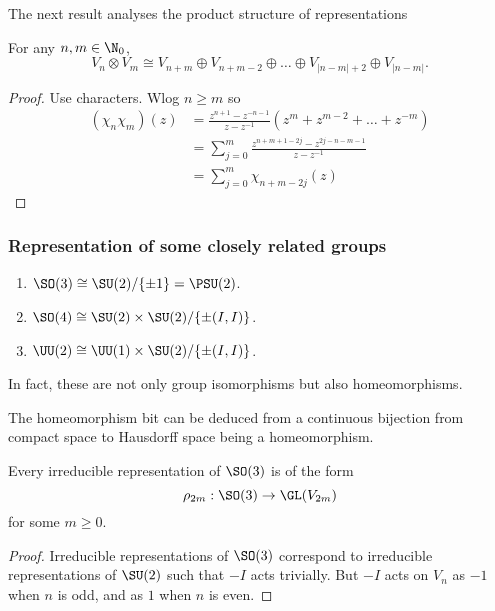\documentclass[a4paper]{article}
\theoremstyle{definition}
\begin{document}
The next result analyses the product structure of representations
\begin{theorem}
  For any \(n, m \in \N_0\),
  \[
    V_n \otimes V_m \cong V_{n + m} \oplus V_{n + m - 2} \oplus \dots \oplus V_{|n - m| + 2} \oplus V_{|n - m|}.
  \]
\end{theorem}

\begin{proof}
  Use characters. Wlog \(n \geq m\) so
  \begin{align*}
    (\chi_n \chi_m) (z)
    &= \frac{z^{n + 1} - z^{-n - 1}}{z - z^{-1}} (z^m + z^{m - 2} + \dots + z^{-m}) \\
    &= \sum_{j = 0}^m \frac{z^{n + m + 1 - 2j} - z^{2j - n - m - 1}}{z - z^{-1}} \\
    &= \sum_{j = 0}^m \chi_{n + m - 2j}(z)
  \end{align*}
\end{proof}

\subsubsection{Representation of some closely related groups}

\begin{proposition}\leavevmode
  \label{prop:isomorphisms of Lie groups}
  \begin{enumerate}
  \item \(\SO(3) \cong \SU(2) /\{\pm 1\} = \PSU(2)\).
  \item \(\SO(4) \cong \SU(2) \times \SU(2)/\{\pm (I, I)\}\).
  \item \(\UU(2) \cong \UU(1) \times \SU(2)/\{\pm (I, I)\}\).
  \end{enumerate}
  In fact, these are not only group isomorphisms but also homeomorphisms.
\end{proposition}
The homeomorphism bit can be deduced from a continuous bijection from compact space to Hausdorff space being a homeomorphism.

\begin{corollary}
  Every irreducible representation of \(\SO(3)\) is of the form
  \[
    \rho_{2m}: \SO(3) \to \GL(V_{2m})
  \]
  for some \(m \geq 0\).
\end{corollary}

\begin{proof}
  Irreducible representations of \(\SO(3)\) correspond to irreducible representations of \(\SU(2)\) such that \(-I\) acts trivially. But \(-I\) acts on \(V_n\) as \(-1\) when \(n\) is odd, and as \(1\) when \(n\) is even.
\end{proof}
\end{document}
